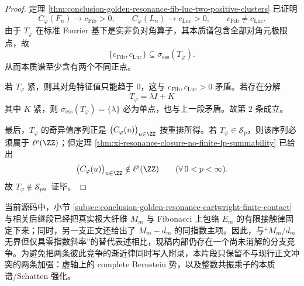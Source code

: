 \begin{proof}
定理 \ref{thm:conclusion-golden-resonance-fib-luc-two-positive-clusters} 已证明
\[
C_\varphi(F_n)\to c_{\mathrm{Fib}}>0,
\qquad
C_\varphi(L_n)\to c_{\mathrm{Luc}}>0,
\qquad
c_{\mathrm{Fib}}\neq c_{\mathrm{Luc}}.
\]
由于 \(T_\varphi\) 在标准 Fourier 基下是实非负对角算子，其本质谱包含全部对角元极限点，故
\[
\{c_{\mathrm{Fib}},c_{\mathrm{Luc}}\}\subseteq \sigma_{\mathrm{ess}}(T_\varphi).
\]
从而本质谱至少含有两个不同正点。

若 \(T_\varphi\) 紧，则其对角特征值只能趋于 \(0\)，这与
\(c_{\mathrm{Fib}},c_{\mathrm{Luc}}>0\)
矛盾。若存在分解
\[
T_\varphi=\lambda I+K
\]
其中 \(K\) 紧，则 \(\sigma_{\mathrm{ess}}(T_\varphi)=\{\lambda\}\) 必为单点，也与上一段矛盾。故第 \(2\) 条成立。

最后，\(T_\varphi\) 的奇异值序列正是
\(\bigl(C_\varphi(u)\bigr)_{u\in\ZZ}\)
按重排所得。若 \(T_\varphi\in\mathcal S_p\)，则该序列必须属于 \(\ell^p(\ZZ)\)；但定理
\ref{thm:xi-resonance-closure-no-finite-lp-summability}
已给出
\[
\bigl(C_\varphi(u)\bigr)_{u\in\ZZ}\notin \ell^p(\ZZ)
\qquad (\forall\,0<p<\infty).
\]
故 \(T_\varphi\notin\mathcal S_p\)。证毕。
\end{proof}

\begin{remark}[本轮未并入的极大纤维分裂链]\label{rem:derived-golden-resonance-maxfiber-branch-conflict}
当前源码中，小节
\ref{subsec:conclusion-golden-resonance-cartwright-finite-contact}
与相关后继段已经把真实极大纤维 \(M_m\) 与 Fibonacci 上包络 \(E_m\) 的有限接触律固定下来；同时，另一支正文还给出了 \(M_m-\bar d_m\) 的同指数主项。因此，与“\(M_m/\bar d_m\) 无界但仅具零指数斜率”的替代表述相比，现稿内部仍存在一个尚未消解的分支竞争。为避免把两条彼此竞争的渐近律同时写入附录，本片段只保留不与现行正文冲突的两条加强：虚轴上的 complete Bernstein 势，以及整数共振乘子的本质谱/Schatten 强化。
\end{remark}
